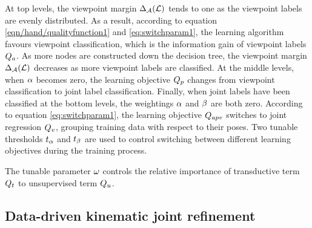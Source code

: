 At top levels, the viewpoint margin $\Delta_{\mathcal{A}}(\mathcal{L})$ tends to one as the viewpoint labels are evenly distributed. As a result, according to equation \ref{eqn/hand/qualityfunction1} and \ref{eq:switchparam1}, the learning algorithm favours viewpoint classification, which is the information gain of viewpoint labels $Q_{a}$. As more nodes are constructed down the decision tree, the viewpoint margin $\Delta_{\mathcal{A}}(\mathcal{L})$ decreases as more viewpoint labels are classified. At the middle levels, when $\alpha$ becomes zero, the learning objective $Q_{p}$ changes from viewpoint classification to joint label classification. Finally, when joint labels have been classified at the bottom levels, the weightings $\alpha$ and $\beta$ are both zero. According to equation \ref{eq:switchparam1}, the learning objective $Q_{apv}$ switches to joint regression $Q_{v}$, grouping training data with respect to their poses. Two tunable thresholds $t_{\alpha}$ and $t_{\beta}$ are used to control switching between different learning objectives during the training process.

The tunable parameter $\omega$ controls the relative importance of transductive term $Q_{t}$ to unsupervised term $Q_{u}$.  

\subsection{Data-driven kinematic joint refinement}
\label{sec/hand/datadriven}

